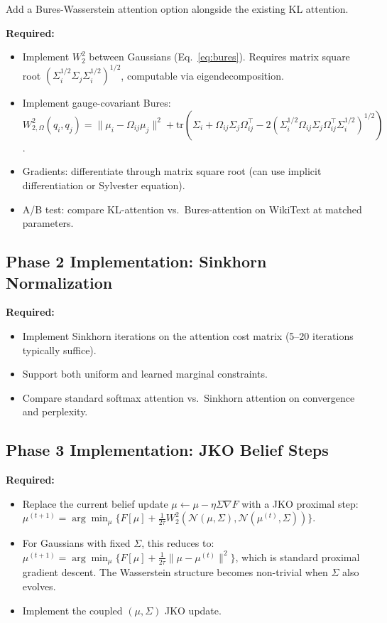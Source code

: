 \documentclass[11pt]{article}
\newcommand{\tr}{\mathrm{tr}}
\begin{document}
Add a Bures-Wasserstein attention option alongside the existing KL attention.

\textbf{Required:}
\begin{itemize}
    \item Implement $W_2^2$ between Gaussians (Eq.~\ref{eq:bures}). Requires matrix square root $(\Sigma_i^{1/2}\Sigma_j\Sigma_i^{1/2})^{1/2}$, computable via eigendecomposition.
    \item Implement gauge-covariant Bures: $W_{2,\Omega}^2(q_i, q_j) = \|\mu_i - \Omega_{ij}\mu_j\|^2 + \tr(\Sigma_i + \Omega_{ij}\Sigma_j\Omega_{ij}^\top - 2(\Sigma_i^{1/2}\Omega_{ij}\Sigma_j\Omega_{ij}^\top\Sigma_i^{1/2})^{1/2})$.
    \item Gradients: differentiate through matrix square root (can use implicit differentiation or Sylvester equation).
    \item A/B test: compare KL-attention vs.\ Bures-attention on WikiText at matched parameters.
\end{itemize}

\subsection{Phase 2 Implementation: Sinkhorn Normalization}

\textbf{Required:}
\begin{itemize}
    \item Implement Sinkhorn iterations on the attention cost matrix (5--20 iterations typically suffice).
    \item Support both uniform and learned marginal constraints.
    \item Compare standard softmax attention vs.\ Sinkhorn attention on convergence and perplexity.
\end{itemize}

\subsection{Phase 3 Implementation: JKO Belief Steps}

\textbf{Required:}
\begin{itemize}
    \item Replace the current belief update $\mu \leftarrow \mu - \eta\Sigma\nabla F$ with a JKO proximal step:
    $\mu^{(t+1)} = \arg\min_\mu \{F[\mu] + \frac{1}{2\tau}W_2^2(\mathcal{N}(\mu,\Sigma), \mathcal{N}(\mu^{(t)},\Sigma))\}$.
    \item For Gaussians with fixed $\Sigma$, this reduces to: $\mu^{(t+1)} = \arg\min_\mu \{F[\mu] + \frac{1}{2\tau}\|\mu - \mu^{(t)}\|^2\}$, which is standard proximal gradient descent. The Wasserstein structure becomes non-trivial when $\Sigma$ also evolves.
    \item Implement the coupled $(\mu, \Sigma)$ JKO update.
\end{itemize}
\end{document}
